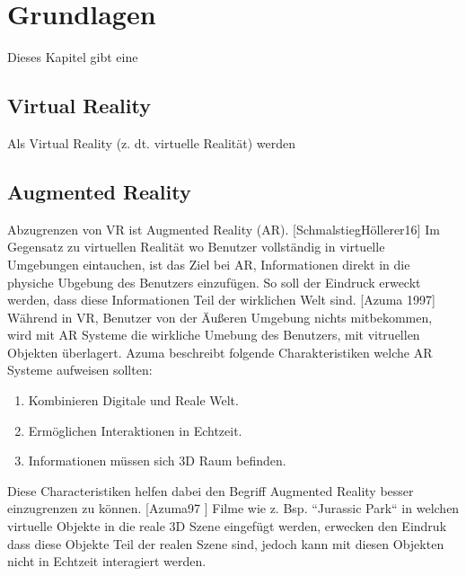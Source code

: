 \chapter{Grundlagen}

Dieses Kapitel gibt eine  

\section{Virtual Reality} 

Als Virtual Reality (z. dt. virtuelle Realität) werden 



\section{Augmented Reality}

Abzugrenzen von VR  ist Augmented Reality (AR). [SchmalstiegHöllerer16] Im Gegensatz zu virtuellen Realität wo Benutzer vollständig in virtuelle Umgebungen eintauchen,
ist das Ziel bei AR, Informationen direkt in die physiche Ubgebung des Benutzers einzufügen. So soll der Eindruck erweckt werden, dass diese Informationen
Teil der wirklichen Welt sind. %
[Azuma 1997] Während in VR, Benutzer von der Äußeren Umgebung nichts mitbekommen, wird mit AR Systeme die wirkliche Umebung des Benutzers, mit vitruellen Objekten überlagert. 
Azuma beschreibt folgende Charakteristiken welche AR Systeme aufweisen sollten: 

\begin{enumerate}
	\item Kombinieren Digitale und Reale Welt.
	\item Ermöglichen Interaktionen in Echtzeit.
	\item Informationen müssen sich 3D Raum befinden.
\end{enumerate}

Diese Characteristiken helfen dabei den Begriff Augmented Reality besser einzugrenzen zu können. [Azuma97 ] Filme wie z. Bsp.  ``Jurassic Park`` in welchen 
virtuelle Objekte in die reale 3D Szene eingefügt werden, erwecken den Eindruk dass diese Objekte Teil der realen Szene sind, jedoch kann mit diesen Objekten nicht in Echtzeit interagiert werden.


